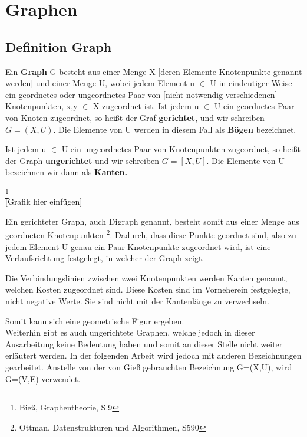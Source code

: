 \chapter{Graphen}

\section{Definition Graph}



\begin{theorem}
Ein \textbf{Graph} G besteht aus einer Menge X [deren Elemente Knotenpunkte genannt werden] und einer Menge U, wobei jedem Element u $\in$ U in eindeutiger Weise ein geordnetes oder ungeordnetes Paar von [nicht notwendig verschiedenen] Knotenpunkten, x,y $\in$ X zugeordnet ist.
Ist jedem u $\in$ U ein geordnetes Paar von Knoten zugeordnet, so heißt der Graf \textbf{gerichtet}, und wir schreiben 
	$G= (X, U)$.
Die Elemente von U werden in diesem Fall als \textbf{Bögen} bezeichnet.

Ist jedem u $\in$ U ein ungeordnetes Paar von Knotenpunkten zugeordnet, so heißt der Graph \textbf{ungerichtet} und wir schreiben 
	$G=[X,U]$. 
Die Elemente von U bezeichnen wir dann als \textbf{Kanten.}
\end{theorem} \footnote{Bieß, Graphentheorie, S.9}\\

[Grafik hier einfügen]


Ein gerichteter Graph, auch Digraph genannt,  besteht somit aus einer Menge aus geordneten Knotenpunkten \footnote{Ottman, Datenstrukturen und Algorithmen, S590}. Dadurch, dass diese Punkte geordnet sind, also zu jedem Element U genau ein Paar Knotenpunkte zugeordnet wird, ist eine Verlaufsrichtung festgelegt, in welcher der Graph zeigt.

Die Verbindungslinien zwischen zwei Knotenpunkten werden Kanten genannt, welchen Kosten zugeordnet sind. Diese Kosten sind im Vorneherein festgelegte, nicht negative Werte. Sie sind  nicht mit der Kantenlänge zu verwechseln.

Somit kann sich eine geometrische Figur ergeben.\\

Weiterhin gibt es auch ungerichtete Graphen, welche jedoch in dieser Ausarbeitung keine Bedeutung haben und somit an dieser Stelle nicht weiter erläutert werden.
In der folgenden Arbeit wird jedoch mit anderen Bezeichnungen gearbeitet. Anstelle von der von Gieß gebrauchten Bezeichnung G=(X,U), wird G=(V,E) verwendet.







